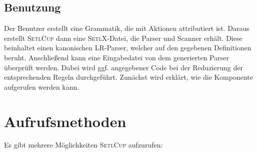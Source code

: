 \subsection{Benutzung}
Der Benutzer erstellt eine Grammatik, die mit Aktionen attributiert ist.  Daraus erstellt \textsc{SetlCup} dann eine \textsc{SetlX}-Datei, die Parser und Scanner erhält. Diese beinhaltet einen kanonischen LR-Parser, welcher auf den gegebenen Definitionen beruht. Anschließend kann eine Eingabedatei von dem generierten Parser überprüft werden. Dabei wird ggf. angegebener Code bei der Reduzierung der entsprechenden Regeln durchgeführt. 
Zunächst wird erklärt, wie die Komponente aufgerufen werden kann.
\section{Aufrufsmethoden}
Es gibt mehrere Möglichkeiten \textsc{SetlCup} aufzurufen:
